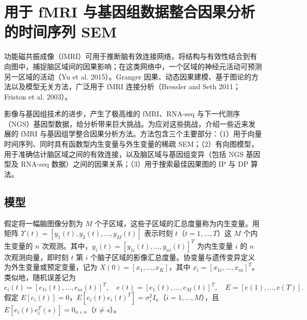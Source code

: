 \section{用于 fMRI 与基因组数据整合因果分析的时间序列 SEM}

功能磁共振成像（fMRI）可用于推断脑有效连接网络，将结构与有效性结合到有向图中，捕捉脑区域间的因果影响；在这类网络中，一个区域的神经元活动可预测另一区域的活动（Yu et al. 2015）。Granger 因果、动态因果建模、基于图论的方法以及模型无关方法，广泛用于 fMRI 连接分析（Bressler and Seth 2011；Friston et al. 2003）。

影像与基因组技术的进步，产生了极高维的 fMRI、RNA-seq 与下一代测序（NGS）基因型数据，给分析带来巨大挑战。为应对这些挑战，介绍一些近来发展的 fMRI 与基因组学整合因果分析方法。方法包含三个主要部分：（1）用于向量时间序列、同时具有函数型内生变量与外生变量的稀疏 SEM；（2）有向图模型，用于准确估计脑区域之间的有效连接，以及脑区域与基因组变异（包括 NGS 基因型及 RNA-seq 数据）之间的因果关系；（3）用于搜索最佳因果图的 IP 与 DP 算法。

\subsection{模型}

假定将一幅脑图像分割为 $M$ 个子区域，这些子区域的汇总度量称为内生变量。用矩阵 $\Upsilon(t)=[y_1(t),y_2(t),\ldots,y_M(t)]$ 表示时刻 $t$（$t=1,\ldots,T$）这 $M$ 个内生变量的 $n$ 次观测。其中，$y_i(t)=[y_{1i}(t),\ldots,y_{ni}(t)]^T$ 为内生变量 $i$ 的 $n$ 次观测向量，即时刻 $t$ 第 $i$ 个脑子区域的影像汇总度量。协变量与遗传变异定义为外生变量或预定变量，记为 $X(0)=[x_1,\ldots,x_K]$，其中 $x_i=[x_{1i},\ldots,x_{ni}]^T$。类似地，随机误差记为
\[
e_i(t)=[e_{1i}(t),\ldots,e_{ni}(t)]^T,\quad
e(t)=[e_1(t),\ldots,e_M(t)]^T,\quad E=[e(1),\ldots,e(T)].
\]
假定 $E[e_i(t)]=0$，$E[e_i(t)e_i(t)^T]=\sigma_i^2I_n$（$i=1,\ldots,M$），且 $E[e_i(t)e_i^T(s)]=0_{n\times n}$（$t\ne s$）。

